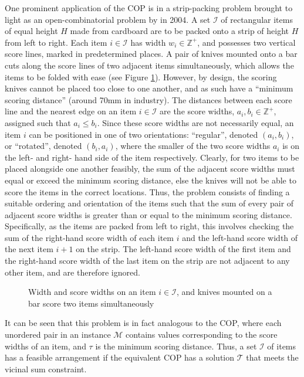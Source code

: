 \documentclass[oribibl]{llncs}
\begin{document}
One prominent application of the COP is in a strip-packing problem brought to light as an open-combinatorial problem by \citeauthor{goulimis2004} in 2004. A set $\mathcal{I}$ of rectangular items of equal height $H$ made from cardboard are to be packed onto a strip of height $H$ from left to right. Each item $i \in \mathcal{I}$ has width $w_i \in \mathbb{Z}^{+}$, and possesses two vertical score lines, marked in predetermined places. A pair of knives mounted onto a bar cuts along the score lines of two adjacent items simultaneously, which allows the items to be folded with ease (see Figure \ref{fig:boxknife}). However, by design, the scoring knives cannot be placed too close to one another, and as such have a ``minimum scoring distance'' (around 70mm in industry). The distances between each score line and the nearest edge on an item $i \in \mathcal{I}$ are the score widths, $a_i, b_i \in \mathbb{Z}^{+}$, assigned such that $a_i \leq b_i$. Since these score widths are not necessarily equal, an item $i$ can be positioned in one of two orientations: ``regular'', denoted $(a_i, b_i)$, or ``rotated'', denoted $(b_i, a_i)$, where the smaller of the two score widths $a_i$ is on the left- and right- hand side of the item respectively. Clearly, for two items to be placed alongside one another feasibly, the sum of the adjacent score widths must equal or exceed the minimum scoring distance, else the knives will not be able to score the items in the correct locations. Thus, the problem consists of finding a suitable ordering and orientation of the items such that the sum of every pair of adjacent score widths is greater than or equal to the minimum scoring distance. Specifically, as the items are packed from left to right, this involves checking the sum of the right-hand score width of each item $i$ and the left-hand score width of the next item $i+1$ on the strip. The left-hand score width of the first item and the right-hand score width of the last item on the strip are not adjacent to any other item, and are therefore ignored. 


\begin{figure}[h!]	
	\centering
	
	\caption{Width and score widths on an item $i \in \mathcal{I}$, and knives mounted on a bar score two items simultaneously}	
	\label{fig:boxknife}
\end{figure}

It can be seen that this problem is in fact analogous to the COP, where each unordered pair in an instance $\mathcal{M}$ contains values corresponding to the score widths of an item, and $\tau$ is the minimum scoring distance. Thus, a set $\mathcal{I}$ of items has a feasible arrangement if the equivalent COP has a solution $\mathcal{T}$ that meets the vicinal sum constraint.
\end{document}
